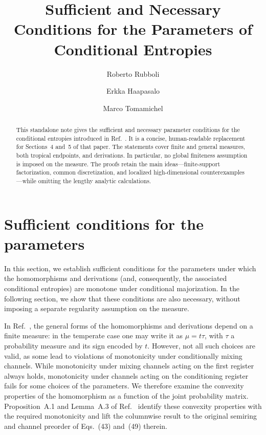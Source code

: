 \documentclass[11pt]{article}
\title{Sufficient and Necessary Conditions for the Parameters of Conditional Entropies}
\author{Roberto Rubboli \and Erkka Haapasalo \and Marco Tomamichel}
\date{}
\theoremstyle{definition}
\begin{document}
\maketitle

\begin{abstract}
This standalone note gives the sufficient and necessary parameter conditions for the
conditional entropies introduced in Ref.~\cite{rubboli2026complete}.  It is a concise,
human-readable replacement for Sections~4 and~5 of that paper.  The statements cover
finite and general measures, both tropical endpoints, and derivations.  In particular,
no global finiteness assumption is imposed on the measure.  The proofs retain the main
ideas---finite-support factorization, common discretization, and localized
high-dimensional counterexamples---while omitting the lengthy analytic calculations.
\end{abstract}

\tableofcontents

\section{Sufficient conditions for the parameters}
\label{sec:sufficient-conditions-measure}

In this section, we establish sufficient conditions for the parameters under which the
homomorphisms and derivations (and, consequently, the associated conditional entropies)
are monotone under conditional majorization.  In the following section, we show that
these conditions are also necessary, without imposing a separate regularity assumption
on the measure.

In Ref.~\cite{rubboli2026complete}, the general forms of the homomorphisms and
derivations depend on a finite measure: in the temperate case one may write it as
$\mu=t\tau$, with $\tau$ a probability measure and its sign encoded by $t$.
However, not all such choices are valid, as some lead to violations of monotonicity
under conditionally mixing channels.
While monotonicity under mixing channels acting on the first register always holds,
monotonicity under channels acting on the conditioning register fails for some choices
of the parameters.  We therefore examine the convexity properties of the homomorphism
as a function of the joint probability matrix.  Proposition~A.1 and Lemma~A.3 of
Ref.~\cite{rubboli2026complete} identify these convexity properties with the required
monotonicity and lift the columnwise result to the original semiring and channel
preorder of Eqs.~(43) and~(49) therein.
\end{document}
